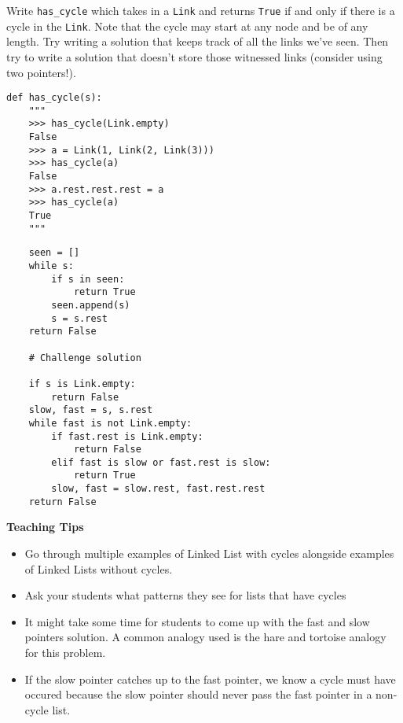 \begin{blocksection}
\question Write \lstinline{has_cycle} which takes in a
\lstinline{Link} and returns \lstinline{True} if and only if there is a cycle in the
\lstinline{Link}. Note that the cycle may start at any node and be of any length.
Try writing a solution that keeps track of all the links we've seen. Then try to
write a solution that doesn't store those witnessed links (consider using
two pointers!).

\begin{lstlisting}
def has_cycle(s):
    """
    >>> has_cycle(Link.empty)
    False
    >>> a = Link(1, Link(2, Link(3)))
    >>> has_cycle(a)
    False
    >>> a.rest.rest.rest = a
    >>> has_cycle(a)
    True
    """
\end{lstlisting}

\begin{solution}[3in]
\begin{lstlisting}
    seen = []
    while s:
        if s in seen:
            return True
        seen.append(s)
        s = s.rest
    return False

    # Challenge solution

    if s is Link.empty:
        return False
    slow, fast = s, s.rest
    while fast is not Link.empty:
        if fast.rest is Link.empty:
            return False
        elif fast is slow or fast.rest is slow:
            return True
        slow, fast = slow.rest, fast.rest.rest
    return False
\end{lstlisting}
\end{solution}
\end{blocksection}

\begin{questionmeta}
\textbf{Teaching Tips}
\begin{itemize}
    \item Go through multiple examples of Linked List with cycles alongside examples of Linked Lists without cycles.
    \item Ask your students what patterns they see for lists that have cycles
    \item It might take some time for students to come up with the fast and slow pointers solution. A common analogy used is the hare and tortoise analogy for this problem.
    \item If the slow pointer catches up to the fast pointer, we know a cycle must have occured because the slow pointer should never pass the fast pointer in a non-cycle list.
\end{itemize}
 \end{questionmeta}